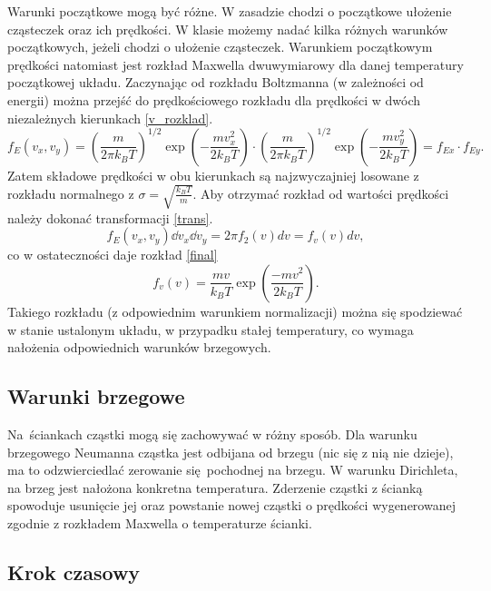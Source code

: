 \documentclass[a4paper, 12pt]{article}
\begin{document}
	Warunki początkowe mogą być różne. 
	W zasadzie chodzi o początkowe ułożenie cząsteczek oraz ich prędkości.
	W klasie możemy nadać kilka różnych warunków początkowych, jeżeli chodzi o ułożenie cząsteczek.
	Warunkiem początkowym prędkości natomiast jest rozkład Maxwella dwuwymiarowy dla danej temperatury początkowej układu.
	Zaczynając od rozkładu Boltzmanna (w zależności od energii) można przejść do prędkościowego rozkładu dla prędkości w dwóch niezależnych kierunkach \eqref{v_rozklad}.
	\begin{equation}
		f_E(v_x,v_y) = \left( \frac{m}{2\pi k_B T} \right) ^ {1/2} \exp(-\frac{mv_x^2}{2k_B T}) \cdot \left( \frac{m}{2\pi k_B T} \right) ^ {1/2} \exp(-\frac{mv_y^2}{2k_B T}) = f_{Ex} \cdot f_{Ey}. 
		\label{v_rozklad}
	\end{equation}
	Zatem składowe prędkości w obu kierunkach są najzwyczajniej losowane z rozkładu normalnego z $\sigma = \sqrt{\frac{k_BT}{m}}$. 
	Aby otrzymać rozkład od wartości prędkości należy dokonać transformacji \eqref{trans}.
	\begin{equation}
		f_E(v_x,v_y)\dd v_x \dd v_y  = 2\pi f_2(v)dv = f_v(v)dv,
		\label{trans}
	\end{equation}
	co w ostateczności daje rozkład \eqref{final}
	\begin{equation}
		f_v(v) = \frac{mv}{k_B T}\exp(\frac{-mv^2}{2k_BT}).
		\label{final}
	\end{equation}
	Takiego rozkładu (z odpowiednim warunkiem normalizacji) można się spodziewać w stanie ustalonym układu, w przypadku stałej temperatury, co wymaga nałożenia odpowiednich warunków brzegowych.
	
	\subsection*{Warunki brzegowe}
	
	Na ściankach cząstki mogą się zachowywać w różny sposób.
	Dla warunku brzegowego Neumanna cząstka jest odbijana od brzegu (nic się z nią nie dzieje), ma to odzwierciedlać zerowanie się pochodnej na brzegu.
	W warunku Dirichleta, na brzeg jest nałożona konkretna temperatura. 
	Zderzenie cząstki z ścianką spowoduje usunięcie jej oraz powstanie nowej cząstki o prędkości wygenerowanej zgodnie z rozkładem Maxwella o temperaturze ścianki.
	
	\subsection*{Krok czasowy}
	
\end{document}
